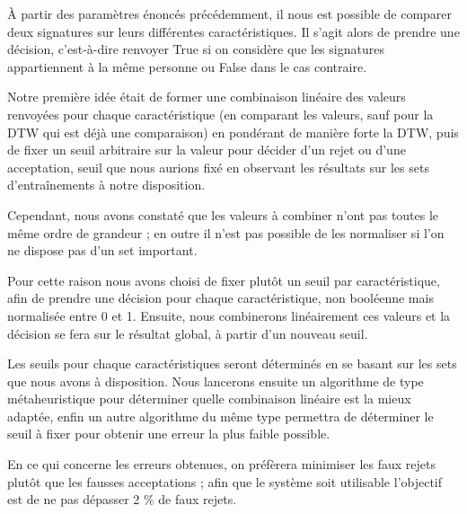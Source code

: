 \documentclass[fontsize=10pt, twoside=no]{scrartcl} %
\begin{document}
\`A partir des paramètres énoncés précédemment, il nous est possible de comparer deux signatures sur leurs différentes caractéristiques. Il s'agit alors de prendre une décision, c'est-à-dire renvoyer True si on considère que les signatures appartiennent à la même personne ou False dans le cas contraire.

Notre première idée était de former une combinaison linéaire des valeurs renvoyées pour chaque caractéristique (en comparant les valeurs, sauf pour la DTW qui est déjà une comparaison) en pondérant de manière forte la DTW, puis de fixer un seuil arbitraire sur la valeur pour décider d'un rejet ou d'une acceptation, seuil que nous aurions fixé en observant les résultats sur les sets d'entraînements à notre disposition.

Cependant, nous avons constaté que les valeurs à combiner n'ont pas toutes le même ordre de grandeur ; en outre il n'est pas possible de les normaliser si l'on ne dispose pas d'un set important.

Pour cette raison nous avons choisi de fixer plutôt un seuil par caractéristique, afin de prendre une décision pour chaque caractéristique, non booléenne mais normalisée entre 0 et 1. Ensuite, nous combinerons linéairement ces valeurs et la décision se fera sur le résultat global, à partir d'un nouveau seuil.

Les seuils pour chaque caractéristiques seront déterminés en se basant sur les sets que nous avons à disposition. Nous lancerons ensuite un algorithme de type métaheuristique pour déterminer quelle combinaison linéaire est la mieux adaptée, enfin un autre algorithme du même type permettra de déterminer le seuil à fixer pour obtenir une erreur la plus faible possible.

En ce qui concerne les erreurs obtenues, on préfèrera minimiser les \og faux rejets \fg plutôt que les \og fausses acceptations \fg ; afin que le système soit utilisable l'objectif est de ne pas dépasser 2 \% de faux rejets.
\end{document}
